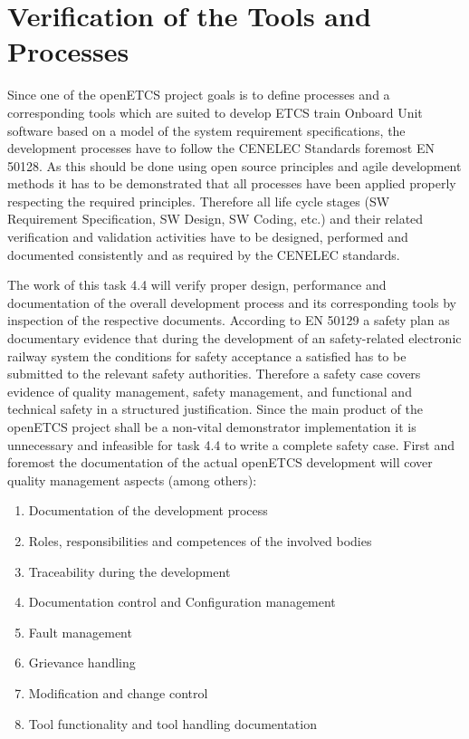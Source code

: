 \section{Verification of the Tools and Processes}
Since one of the openETCS project goals is to define processes and a corresponding tools which are suited to develop ETCS train Onboard Unit software based on a model of the system requirement specifications, the development processes have to follow the CENELEC Standards foremost EN 50128. As this should be done using open source principles and agile development methods it has to be demonstrated that all processes have been applied properly respecting the required principles. Therefore all life cycle stages (SW Requirement Specification, SW Design, SW Coding, etc.) and their related verification and validation activities have to be designed, performed and documented consistently and as required by the CENELEC standards. 

The work of this task 4.4 will verify proper design, performance and documentation of the overall development process and its corresponding tools by inspection of the respective documents. According to EN 50129 a safety plan as documentary evidence that during the development of an safety-related electronic railway system the conditions for safety acceptance a satisfied has to be submitted to the relevant safety authorities. Therefore a safety case covers evidence of quality management, safety management, and functional and technical safety in a structured justification. Since  the main product of the openETCS project shall be a non-vital demonstrator implementation it is unnecessary and infeasible for task 4.4 to write a complete safety case. First and foremost the documentation of the actual openETCS development will cover quality management aspects (among others):
\begin{enumerate}
\item  Documentation of the development process
\item  Roles, responsibilities and competences of the involved bodies
\item  Traceability during the development
\item  Documentation control and Configuration management
\item  Fault management
\item  Grievance handling
\item  Modification and change control
\item  Tool functionality and tool handling documentation
\end{enumerate}

